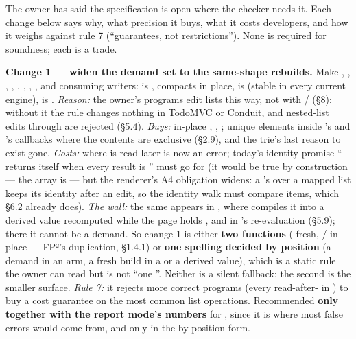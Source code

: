
The owner has said the specification is open where the checker needs it. Each change below says why, what precision it buys, what it costs developers, and how it weighs against rule 7 (“guarantees, not restrictions”). None is required for soundness; each is a trade.

\textbf{Change 1 — widen the demand set to the same-shape rebuilds.} Make , , , , , , , ,  and  consuming writers:  is ,  compacts in place,  is  (stable in every current engine),  is . \emph{Reason:} the owner's programs edit lists this way, not with / (§8): without it the rule changes nothing in TodoMVC or Conduit, and nested-list edits through  are rejected (§5.4). \emph{Buys:} in-place , , ; unique elements inside 's and 's callbacks where the contents are exclusive (§2.9), and the trie's last reason to exist gone. \emph{Costs:}  where  is read later is now an error; today's identity promise “ returns  itself when every result is \code{===}” must go for  (it would be true by construction — the array is  — but the renderer's A4 obligation widens: a 's  over a mapped list keeps its identity after an edit, so the identity walk must compare items, which  §6.2 already does). \emph{The wall:} the same  appears in , where  compiles it into a derived value recomputed while the page holds , and in 's re-evaluation (§5.9); there it cannot be a demand. So change 1 is either \textbf{two functions} ( fresh, / in place — FP²'s duplication, §1.4.1) or \textbf{one spelling decided by position} (a demand in an  arm, a fresh build in a  or a derived value), which is a static rule the owner can read but is not “one ”. Neither is a silent fallback; the second is the smaller surface. \emph{Rule 7:} it rejects more correct programs (every read-after- in ) to buy a cost guarantee on the most common list operations. Recommended \textbf{only together with the report mode's numbers} for , since it is where most false errors would come from, and only in the by-position form.

